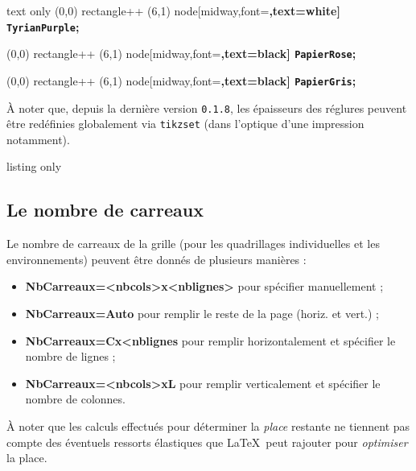 \documentclass[a4paper]{article}
\newcommand\Cle[1]{{\bfseries\sffamily\textlangle #1\textrangle}}
\begin{document}
\begin{PresentationCode}{text only}
{\tikz \filldraw[TyrianPurple] (0,0) rectangle++ (6,1) node[midway,font=\bfseries\large,text=white] {\verb+TyrianPurple+};}

{\tikz \filldraw[PapierRose] (0,0) rectangle++ (6,1) node[midway,font=\bfseries\large,text=black] {\verb+PapierRose+};}

{\tikz \filldraw[PapierGris] (0,0) rectangle++ (6,1) node[midway,font=\bfseries\large,text=black] {\verb+PapierGris+};}
\end{PresentationCode}

À noter que, depuis la dernière version \texttt{0.1.8}, les épaisseurs des réglures peuvent être redéfinies globalement via \texttt{tikzset} (dans l'optique d'une impression notamment).

\begin{PresentationCode}{listing only}
\end{PresentationCode}

\subsection{Le nombre de carreaux}

Le nombre de carreaux de la grille (pour les quadrillages individuelles et les environnements) peuvent être donnés de plusieurs manières :

\begin{itemize}
	\item \Cle{NbCarreaux=<nbcols>x<nblignes>} pour spécifier manuellement ;
	\item \Cle{NbCarreaux=Auto} pour remplir le reste de la page (horiz. et vert.) ;
	\item \Cle{NbCarreaux=Cx<nblignes} pour remplir horizontalement et spécifier le nombre de lignes ;
	\item \Cle{NbCarreaux=<nbcols>xL} pour remplir verticalement et spécifier le nombre de colonnes.
\end{itemize}

À noter que les calculs effectués pour déterminer la \textit{place} restante ne tiennent pas compte des éventuels ressorts élastiques que \LaTeX\ peut rajouter pour \textit{optimiser} la place.

\smallskip
\end{document}
